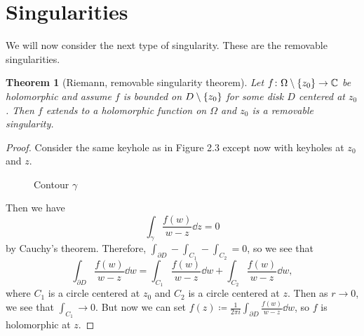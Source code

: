 \documentclass[leqno, openany]{memoir}
\newtheorem{thm}{Theorem}[section]
\theoremstyle{definition}
\theoremstyle{remark}
\theoremstyle{plain}
\theoremstyle{definition}
\theoremstyle{remark}
\newcommand{\C}{\mathbb{C}}
\begin{document}
\section{Singularities}%
\label{sec:singularities}

We will now consider the next type of singularity. These are the removable singularities.

\begin{thm}[Riemann, removable singularity theorem]
    Let $f \colon \Omega \setminus \qty{z_0} \to \C$ be holomorphic and assume $f$ is bounded on $D \setminus \qty{z_0}$ for some disk $D$ centered at $z_0$. Then $f$ extends to a holomorphic function on $\Omega$ and $z_0$ is a removable singularity.
\end{thm}

\begin{proof}
    Consider the same keyhole as in Figure 2.3 except now with keyholes at $z_0$ and $z$. 
\begin{figure}[H]
\begin{center}
\end{center}
\caption{Contour $\gamma$}%
\label{fig:}
\end{figure}
    Then we have
    \[ \int_{\gamma} \frac{f(w)}{w-z} \dd{z} = 0 \]
    by Cauchy's theorem. Therefore, $\int_{\partial D} - \int_{C_1} - \int_{C_2} = 0$, so we see that
    \[ \int_{\partial D} \frac{f(w)}{w-z} \dd{w} = \int_{C_1} \frac{f(w)}{w-z} \dd{w} + \int_{C_2} \frac{f(w)}{w-z} \dd{w}, \]
    where $C_1$ is a circle centered at $z_0$ and $C_2$ is a circle centered at $z$. Then as $r \to 0$, we see that $\int_{C_1} \to 0$. But now we can set $f(z) \coloneqq \frac{1}{2 \pi i} \int_{\partial D} \frac{f(w)}{w-z} \dd{w}$, so $f$ is holomorphic at $z$.
\end{proof}
\end{document}
